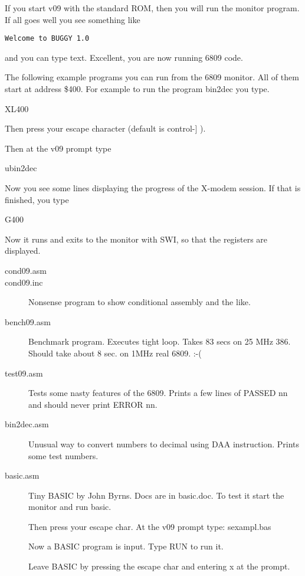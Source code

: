 If you start v09 with the standard ROM, then you will run the monitor
program.
If all goes well you see something like
\begin{verbatim}
Welcome to BUGGY 1.0
\end{verbatim}
and you can type text. Excellent, you are now running 6809 code.

The following example programs you can run from the 6809 monitor.
All of them start at address \$400. For example to run the program bin2dec
you type.

XL400

Then press your escape character (default is control-] ).

Then at the v09 prompt type 

ubin2dec

Now you see some lines displaying the progress of the X-modem session.
If that is finished, you type

G400

Now it runs and exits to the monitor with SWI, so that the registers are
displayed.  

\begin{description}
\item[cond09.asm] 
\item[cond09.inc]  Nonsense program to show conditional assembly and the like.

\item[bench09.asm] Benchmark program. Executes tight loop. Takes 83 secs on
            25 MHz 386. Should take about 8 sec. on 1MHz real 6809. :-(

\item[test09.asm]  Tests  some nasty features of the 6809. Prints a few lines
            of PASSED nn and should never print ERROR nn.

\item[bin2dec.asm] Unusual way to convert numbers to decimal using DAA instruction.
            Prints some test numbers.

\item[basic.asm] Tiny BASIC by John Byrns. Docs are in basic.doc.
            To test it start the monitor and run basic.
	    
            Then press your escape char.
            At the v09 prompt type: sexampl.bas

	    Now a BASIC program is input.
	    Type RUN to run it.
	
	    Leave BASIC by pressing the escape char and entering x at the
	    prompt.
\end{description} 


